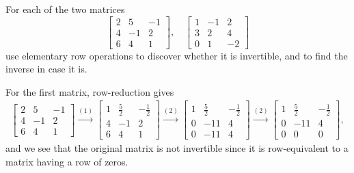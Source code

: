  For each of the two matrices
\begin{equation*}
  \begin{bmatrix}
    2 & 5 & -1 \\
    4 & -1 & 2 \\
    6 & 4 & 1
  \end{bmatrix},
  \quad
  \begin{bmatrix}
    1 & -1 & 2 \\
    3 & 2 & 4 \\
    0 & 1 & -2
  \end{bmatrix}
\end{equation*}
use elementary row operations to discover whether it is invertible,
and to find the inverse in case it is.
\begin{solution}
  For the first matrix, row-reduction gives
  \begin{gather*}
    \begin{bmatrix}
      2 & 5 & -1 \\
      4 & -1 & 2 \\
      6 & 4 & 1
    \end{bmatrix}
    \xrightarrow{(1)}
    \begin{bmatrix}
      1 & \frac52 & -\frac12 \\[3pt]
      4 & -1 & 2 \\[3pt]
      6 & 4 & 1
    \end{bmatrix}
    \xrightarrow{(2)}
    \begin{bmatrix}
      1 & \frac52 & -\frac12 \\[3pt]
      0 & -11 & 4 \\[3pt]
      0 & -11 & 4
    \end{bmatrix}
    \xrightarrow{(2)}
    \begin{bmatrix}
      1 & \frac52 & -\frac12 \\[3pt]
      0 & -11 & 4 \\[3pt]
      0 & 0 & 0
    \end{bmatrix},
  \end{gather*}
  and we see that the original matrix is not invertible since it is
  row-equivalent to a matrix having a row of zeros.


\end{solution}
